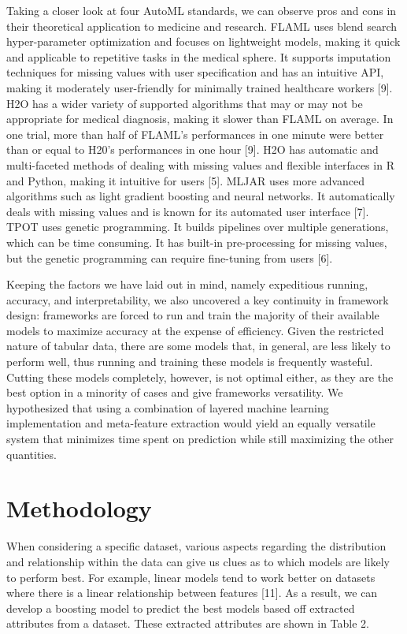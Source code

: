 \documentclass{article}
\begin{document}
Taking a closer look at four AutoML standards, we can observe pros and cons in their theoretical application to medicine and research. FLAML uses blend search hyper-parameter optimization and focuses on lightweight models, making it quick and applicable to repetitive tasks in the medical sphere. It supports imputation techniques for missing values with user specification and has an intuitive API, making it moderately user-friendly for minimally trained healthcare workers [9]. H2O has a wider variety of supported algorithms that may or may not be appropriate for medical diagnosis, making it slower than FLAML on average. In one trial, more than half of FLAML's performances in one minute were better than or equal to H20's performances in one hour [9]. H2O has automatic and multi-faceted methods of dealing with missing values and flexible interfaces in R and Python, making it intuitive for users [5]. MLJAR uses more advanced algorithms such as light gradient boosting and neural networks. It automatically deals with missing values and is known for its automated user interface [7]. TPOT uses genetic programming. It builds pipelines over multiple generations, which can be time consuming. It has built-in pre-processing for missing values, but the genetic programming can require fine-tuning from users [6].

Keeping the factors we have laid out in mind, namely expeditious running, accuracy, and interpretability, we also uncovered a key continuity in framework design: frameworks are forced to run and train the majority of their available models to maximize accuracy at the expense of efficiency. Given the restricted nature of tabular data, there are some models that, in general, are less likely to perform well, thus running and training these models is frequently wasteful. Cutting these models completely, however, is not optimal either, as they are the best option in a minority of cases and give frameworks versatility. We hypothesized that using a combination of layered machine learning implementation and meta-feature extraction would yield an equally versatile system that minimizes time spent on prediction while still maximizing the other quantities. 

\section{Methodology}
When considering a specific dataset, various aspects regarding the distribution and relationship within the data can give us clues as to which models are likely to perform best. For example, linear models tend to work better on datasets where there is a linear relationship between features [11]. As a result, we can develop a boosting model to predict the best models based off extracted attributes from a dataset. These extracted attributes are shown in Table 2. 
\end{document}
